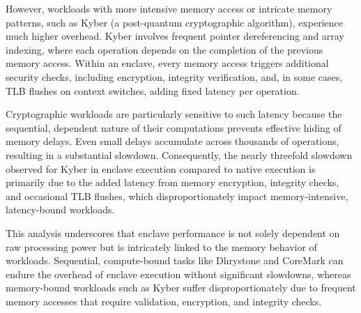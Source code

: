 However, workloads with more intensive memory access or intricate memory patterns, such as Kyber (a post-quantum cryptographic algorithm), experience much higher overhead. Kyber involves frequent pointer dereferencing and array indexing, where each operation depends on the completion of the previous memory access. Within an enclave, every memory access triggers additional security checks, including encryption, integrity verification, and, in some cases, TLB flushes on context switches, adding fixed latency per operation. 

Cryptographic workloads are particularly sensitive to such latency because the sequential, dependent nature of their computations prevents effective hiding of memory delays. Even small delays accumulate across thousands of operations, resulting in a substantial slowdown. Consequently, the nearly threefold slowdown observed for Kyber in enclave execution compared to native execution is primarily due to the added latency from memory encryption, integrity checks, and occasional TLB flushes, which disproportionately impact memory-intensive, latency-bound workloads.

This analysis underscores that enclave performance is not solely dependent on raw processing power but is intricately linked to the memory behavior of workloads. Sequential, compute-bound tasks like Dhrystone and CoreMark can endure the overhead of enclave execution without significant slowdowns, whereas memory-bound workloads such as Kyber suffer disproportionately due to frequent memory accesses that require validation, encryption, and integrity checks.

